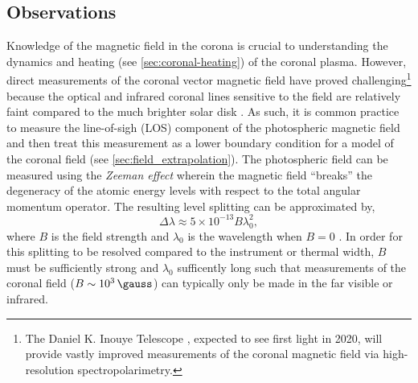 \subsection{Observations}\label{sec:magnetic-observations}

Knowledge of the magnetic field in the corona is crucial to understanding the dynamics and heating (see \autoref{sec:coronal-heating}) of the coronal plasma. However, direct measurements of the coronal vector magnetic field have proved challenging\footnote{The Daniel K. Inouye Telescope \citep{elmore_daniel_2014}, expected to see first light in 2020, will provide vastly improved measurements of the coronal magnetic field via high-resolution spectropolarimetry.} because the optical and infrared coronal lines sensitive to the field are relatively faint compared to the much brighter solar disk \citep{judge_coronal_2001}. As such, it is common practice to measure the line-of-sigh (LOS) component of the photospheric magnetic field and then treat this measurement as a lower boundary condition for a model of the coronal field (see \autoref{sec:field_extrapolation}). The photospheric field can be measured using the \textit{Zeeman effect} wherein the magnetic field ``breaks'' the degeneracy of the atomic energy levels with respect to the total angular momentum operator. The resulting level splitting can be approximated by,
\begin{equation}\label{eq:zeeman}
    \Delta\lambda \approx 5\times10^{-13}B\lambda_0^2,
\end{equation}
where $B$ is the field strength and $\lambda_0$ is the wavelength when $B=0$ \citep{phillips_ultraviolet_2008}. In order for this splitting to be resolved compared to the instrument or thermal width, $B$ must be sufficiently strong and $\lambda_0$ sufficently long such that measurements of the coronal field ($B\sim\SI{e3}{\gauss}$) can typically only be made in the far visible or infrared.

